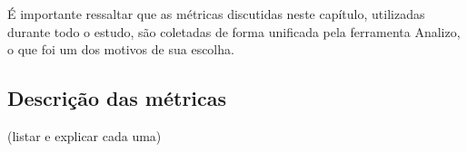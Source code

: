 É importante ressaltar que as métricas discutidas neste capítulo, utilizadas durante todo o estudo, são coletadas de forma unificada pela ferramenta Analizo, o que foi um dos motivos de sua escolha.

\subsection{Descrição das métricas}

(listar e explicar cada uma)
